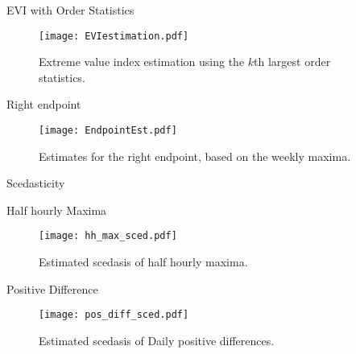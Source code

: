 \documentclass[notes]{beamer}
\begin{document}

\begin{frame}{EVI with Order Statistics }
\begin{figure}
\begin{center}
\texttt{[image: EVIestimation.pdf]}
\caption{Extreme value index estimation using the $k$th largest order statistics.} \label{fig:POTEst}
\end{center}
\end{figure}
\end{frame}


\begin{frame}{Right endpoint}
\begin{figure}
\begin{center}
\texttt{[image: EndpointEst.pdf]}
\caption{Estimates for the right endpoint, based on the weekly maxima.} \label{fig:EndPointEst}
\end{center}
\end{figure}
\end{frame}


\begin{frame}{Scedasticity}

\end{frame}


\begin{frame}{Half hourly Maxima}
\begin{figure}
\centering
\texttt{[image: hh\_max\_sced.pdf]}
\caption{Estimated scedasis of half hourly maxima.}
\label{fig:hh_max_sced} 
\end{figure}
\end{frame}


\begin{frame}{Positive Difference}
\begin{figure}
\centering
\texttt{[image: pos\_diff\_sced.pdf]}
\caption{Estimated scedasis of Daily positive differences.}
\label{fig:pos_diff_sced} 
\end{figure}
\end{frame}
\end{document}
